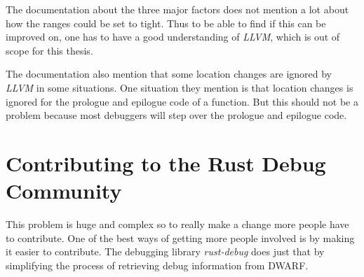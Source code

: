 The documentation about the three major factors does not mention a lot about how the ranges could be set to tight.
Thus to be able to find if this can be improved on, one has to have a good understanding of \emph{LLVM}, which is out of scope for this thesis.


The documentation also mention that some location changes are ignored by \emph{LLVM} in some situations.
One situation they mention is that location changes is ignored for the prologue and epilogue code of a function.
But this should not be a problem because most debuggers will step over the prologue and epilogue code.



\section{Contributing to the Rust Debug Community}
This problem is huge and complex so to really make a change more people have to contribute.
One of the best ways of getting more people involved is by making it easier to contribute.
The debugging library \emph{rust-debug} does just that by simplifying the process of retrieving debug information from \gls{DWARF}.


